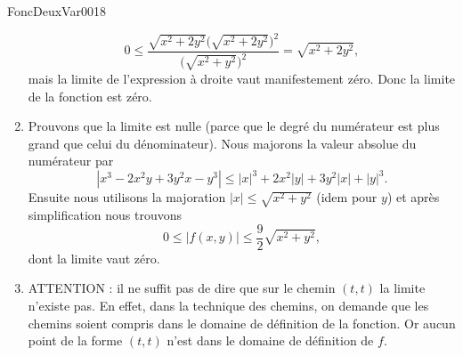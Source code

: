 \begin{corrige}{FoncDeuxVar0018}
\begin{enumerate}
			\begin{equation}
				0\leq \frac{ \sqrt{x^2+2y^2}\big( \sqrt{x^2+2y^2} \big)^2 }{ \big( \sqrt{x^2+y^2} \big)^2 }=\sqrt{x^2+2y^2},
			\end{equation}
			mais la limite de l'expression à droite vaut manifestement zéro. Donc la limite de la fonction est zéro.
		\item	%
			Prouvons que la limite est nulle (parce que le degré du numérateur est plus grand que celui du dénominateur). Nous majorons la valeur absolue du numérateur par
			\begin{equation}
				| x^3-2x^2y+3y^2x-y^3 |\leq | x |^3+2x^2| y |+3y^2| x |+| y |^3.
			\end{equation}
			Ensuite nous utilisons la majoration $| x |\leq\sqrt{x^2+y^2}$ (idem pour $y$) et après simplification nous trouvons
			\begin{equation}
				0\leq| f(x,y) |\leq \frac{ 9 }{2}\sqrt{x^2+y^2},
			\end{equation}
			dont la limite vaut zéro.
		\item	%
			ATTENTION : il ne suffit pas de dire que sur le chemin $(t,t)$ la limite n'existe pas. En effet, dans la technique des chemins, on demande que les chemins soient compris dans le domaine de définition de la fonction. Or aucun point de la forme $(t,t)$ n'est dans le domaine de définition de $f$.


\end{enumerate}
\end{corrige}
